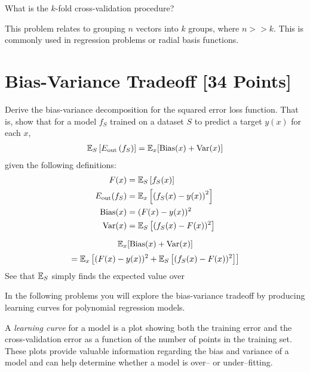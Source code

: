 \begin{problem}[2]
  What is the $k$-fold cross-validation procedure?
\end{problem}
\begin{solution}
  This problem relates to grouping $n$ vectors into $k$ groups, where $n >> k$. This is commonly used in regression problems or radial basis functions.
\end{solution}




\newpage
\section{Bias-Variance Tradeoff [34 Points]}

\begin{problem}[5]
  Derive the bias-variance decomposition for the squared error loss function. That is, show that for a model $f_S$ trained on a dataset $S$ to predict a target $y(x)$ for each $x$,
  \begin{align*}
    \mathbb{E}_S \left[E_\text{out}\left(f_S\right)\right] = \mathbb{E}_x[\operatorname{Bias}(x) + \operatorname{Var}(x)]
  \end{align*}
  given the following definitions:
  \begin{align*}
    F(x) &= \mathbb{E}_S\left[f_S(x) \right] \\
    E_\text{out}(f_S) &= \mathbb{E}_x\left[\left(f_S(x) - y(x)\right)^2\right] \\
    \operatorname{Bias}(x) &= (F(x) - y(x))^2 \\
    \operatorname{Var}(x) &= \mathbb{E}_S\left[(f_S(x)-F(x))^2\right]
  \end{align*}
\end{problem}

\begin{solution}
$$
\mathbb{E}_x[\operatorname{Bias}(x) + \operatorname{Var}(x)]
$$$$
= \mathbb{E}_x\left[(F(x) - y(x))^2 +  \mathbb{E}_S\left[(f_S(x)-F(x))^2\right]\right]
$$
See that $\mathbb{E}_S$ simply finds the expected value over
\end{solution}

In the following problems you will explore the bias-variance tradeoff by producing learning curves for polynomial regression models.

A \emph{learning curve} for a model is a plot showing both the training error and the cross-validation error as a function of the number of points in the training set. These plots provide valuable information regarding the bias and variance of a model and can help determine whether a model is over-- or under--fitting.

